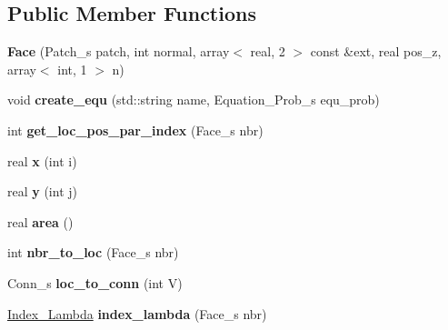 \subsection*{Public Member Functions}
\begin{DoxyCompactItemize}
\item 
\hypertarget{classFace_a3b8f88dfdae278eb7ac120e3a09ae333}{
{\bfseries Face} (Patch\_\-s patch, int normal, array$<$ real, 2 $>$ const \&ext, real pos\_\-z, array$<$ int, 1 $>$ n)}
\label{classFace_a3b8f88dfdae278eb7ac120e3a09ae333}

\item 
\hypertarget{classFace_a23e698d2341c3634212729c78bba154f}{
void {\bfseries create\_\-equ} (std::string name, Equation\_\-Prob\_\-s equ\_\-prob)}
\label{classFace_a23e698d2341c3634212729c78bba154f}

\item 
\hypertarget{classFace_a7ebc4163752a05d82e184a3a4c8671b3}{
int {\bfseries get\_\-loc\_\-pos\_\-par\_\-index} (Face\_\-s nbr)}
\label{classFace_a7ebc4163752a05d82e184a3a4c8671b3}

\item 
\hypertarget{classFace_aed5980668f26bc29338dfa11b32919f5}{
real {\bfseries x} (int i)}
\label{classFace_aed5980668f26bc29338dfa11b32919f5}

\item 
\hypertarget{classFace_a9a4d892bf5e8782c898e15aa5a989806}{
real {\bfseries y} (int j)}
\label{classFace_a9a4d892bf5e8782c898e15aa5a989806}

\item 
\hypertarget{classFace_a2d20ebd0d99063967bb26657abebbcbe}{
real {\bfseries area} ()}
\label{classFace_a2d20ebd0d99063967bb26657abebbcbe}

\item 
\hypertarget{classFace_a06eb55371bc742e523a9eb94a573209d}{
int {\bfseries nbr\_\-to\_\-loc} (Face\_\-s nbr)}
\label{classFace_a06eb55371bc742e523a9eb94a573209d}

\item 
\hypertarget{classFace_a60baec409a104a88e6622efa2f80122c}{
Conn\_\-s {\bfseries loc\_\-to\_\-conn} (int V)}
\label{classFace_a60baec409a104a88e6622efa2f80122c}

\item 
\hypertarget{classFace_a9a5eb93863dc767848261afa813ca039}{
\hyperlink{structIndex__Lambda}{Index\_\-Lambda} {\bfseries index\_\-lambda} (Face\_\-s nbr)}
\label{classFace_a9a5eb93863dc767848261afa813ca039}


\end{DoxyCompactItemize}
